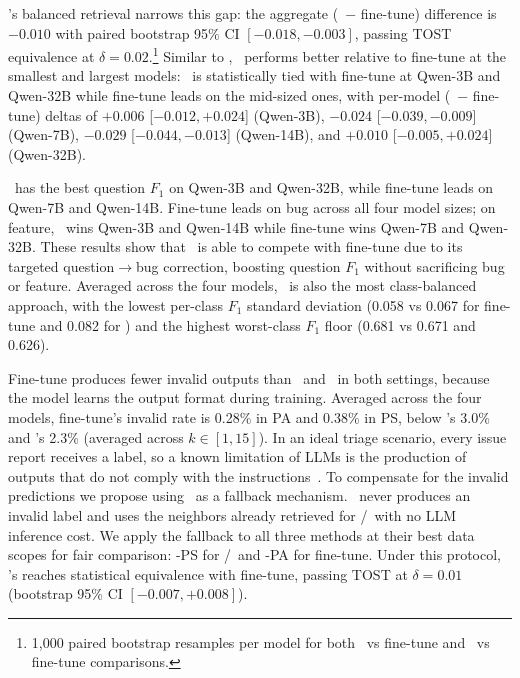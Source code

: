 \bragtag's balanced retrieval narrows this gap: the aggregate (\bragtag\ $-$ fine-tune) difference is $-0.010$ with paired bootstrap 95\% CI $[-0.018, -0.003]$, passing TOST equivalence at $\delta{=}0.02$.\footnote{1{,}000 paired bootstrap resamples per model for both \ragtag\ vs fine-tune and \bragtag\ vs fine-tune comparisons.} Similar to \ragtag, \bragtag\ performs better relative to fine-tune at the smallest and largest models: \bragtag\ is statistically tied with fine-tune at Qwen-3B and Qwen-32B while fine-tune leads on the mid-sized ones, with per-model (\bragtag\ $-$ fine-tune) deltas of $+0.006$ [$-0.012, +0.024$] (Qwen-3B), $-0.024$ [$-0.039, -0.009$] (Qwen-7B), $-0.029$ [$-0.044, -0.013$] (Qwen-14B), and $+0.010$ [$-0.005, +0.024$] (Qwen-32B).

\bragtag\ has the best question $F_1$ on Qwen-3B and Qwen-32B, while fine-tune leads on Qwen-7B and Qwen-14B. Fine-tune leads on bug across all four model sizes; on feature, \bragtag\ wins Qwen-3B and Qwen-14B while fine-tune wins Qwen-7B and Qwen-32B. These results show that \bragtag\ is able to compete with fine-tune due to its targeted question$\rightarrow$bug correction, boosting question $F_1$ without sacrificing bug or feature. Averaged across the four models, \bragtag\ is also the most class-balanced approach, with the lowest per-class $F_1$ standard deviation (0.058 vs 0.067 for fine-tune and 0.082 for \ragtag) and the highest worst-class $F_1$ floor (0.681 vs 0.671 and 0.626).

Fine-tune produces fewer invalid outputs than \ragtag\ and \bragtag\ in both settings, because the model learns the output format during training. Averaged across the four models, fine-tune's invalid rate is 0.28\% in PA and 0.38\% in PS, below \ragtag's 3.0\% and \bragtag's 2.3\% (averaged across $k\in[1,15]$). In an ideal triage scenario, every issue report receives a label, so a known limitation of LLMs is the production of outputs that do not comply with the instructions~\cite{sclar2023quantifying, akhavan2026linkanchorautonomousllmbasedagent}. To compensate for the invalid predictions we propose using \votag\ as a fallback mechanism. \votag\ never produces an invalid label and uses the neighbors already retrieved for \ragtag/\bragtag\ with no LLM inference cost. We apply the fallback to all three methods at their best data scopes for fair comparison: \votag-PS for \ragtag/\bragtag\ and \votag-PA for fine-tune. Under this protocol, \bragtag's reaches statistical equivalence with fine-tune, passing TOST at $\delta{=}0.01$ (bootstrap 95\% CI $[-0.007, +0.008]$).

